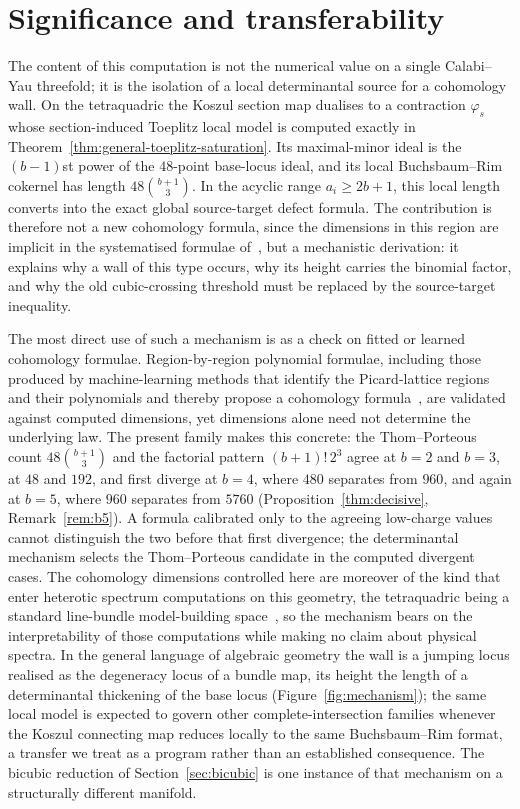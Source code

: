 \documentclass[11pt]{article}
\theoremstyle{plain}
\theoremstyle{definition}
\theoremstyle{remark}
\begin{document}
\section{Significance and transferability}\label{sec:significance}

The content of this computation is not the numerical value on a single Calabi--Yau threefold; it is the isolation of a local determinantal source for a cohomology wall. On the tetraquadric the Koszul section map dualises to a contraction $\varphi_s$ whose section-induced Toeplitz local model is computed exactly in Theorem~\ref{thm:general-toeplitz-saturation}. Its maximal-minor ideal is the $(b-1)$st power of the $48$-point base-locus ideal, and its local Buchsbaum--Rim cokernel has length $48\binom{b+1}{3}$. In the acyclic range $a_i\ge2b+1$, this local length converts into the exact global source-target defect formula. The contribution is therefore not a new cohomology formula, since the dimensions in this region are implicit in the systematised formulae of~\cite{ConstantinLukas2019}, but a mechanistic derivation: it explains why a wall of this type occurs, why its height carries the binomial factor, and why the old cubic-crossing threshold must be replaced by the source-target inequality.

The most direct use of such a mechanism is as a check on fitted or learned cohomology formulae. Region-by-region polynomial formulae, including those produced by machine-learning methods that identify the Picard-lattice regions and their polynomials and thereby propose a cohomology formula~\cite{BrodieMLcohomology,ConstantinLukas2019}, are validated against computed dimensions, yet dimensions alone need not determine the underlying law. The present family makes this concrete: the Thom--Porteous count $48\binom{b+1}{3}$ and the factorial pattern $(b+1)!\,2^3$ agree at $b=2$ and $b=3$, at $48$ and $192$, and first diverge at $b=4$, where $480$ separates from $960$, and again at $b=5$, where $960$ separates from $5760$ (Proposition~\ref{thm:decisive}, Remark~\ref{rem:b5}). A formula calibrated only to the agreeing low-charge values cannot distinguish the two before that first divergence; the determinantal mechanism selects the Thom--Porteous candidate in the computed divergent cases. The cohomology dimensions controlled here are moreover of the kind that enter heterotic spectrum computations on this geometry, the tetraquadric being a standard line-bundle model-building space~\cite{BCL2014}, so the mechanism bears on the interpretability of those computations while making no claim about physical spectra. In the general language of algebraic geometry the wall is a jumping locus realised as the degeneracy locus of a bundle map, its height the length of a determinantal thickening of the base locus (Figure~\ref{fig:mechanism}); the same local model is expected to govern other complete-intersection families whenever the Koszul connecting map reduces locally to the same Buchsbaum--Rim format, a transfer we treat as a program rather than an established consequence. The bicubic reduction of Section~\ref{sec:bicubic} is one instance of that mechanism on a structurally different manifold.
\end{document}
